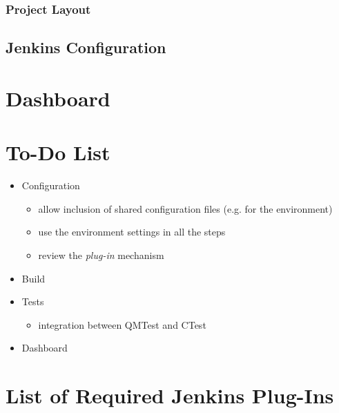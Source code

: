 \documentclass{lhcbnote}
\begin{document}
\subsubsection{Project Layout}


\subsection{Jenkins Configuration}

\section{Dashboard}

\section{To-Do List}
\begin{itemize}
  \item Configuration
  \begin{itemize}
    \item allow inclusion of shared configuration files (e.g. for the
environment)
    \item use the environment settings in all the steps
    \item review the \emph{plug-in} mechanism
  \end{itemize}
  \item Build
  \item Tests
  \begin{itemize}
    \item integration between QMTest and CTest
  \end{itemize}
  \item Dashboard
\end{itemize}





%


\appendix
\section{List of Required Jenkins Plug-Ins}
\end{document}
